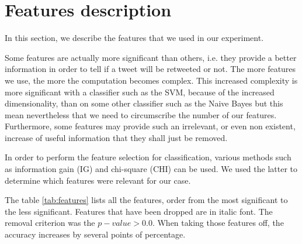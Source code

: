 \section{Features description}
\label{sec:features}

In this section, we describe the features that we used in our experiment.

Some features are actually more significant than others, i.e. they provide a 
better information in order to tell if a tweet will be retweeted or not.
The more features we use, the more the computation becomes 
complex. This increased complexity is more significant with a classifier such 
as the SVM, because of the increased dimensionality, than on some other 
classifier such as the Naive Bayes but this mean nevertheless that we need to 
circumscribe the number of our features. Furthermore, some features may provide 
such an irrelevant, or even non existent, increase of useful information that 
they shall just be removed.

In order to perform the feature selection for classification, various methods 
such as information gain (IG) and chi-square (CHI) can be used. We used the 
latter to determine which features were relevant for our case.

The table \ref{tab:features} lists all the features, order from the most 
significant to the less significant. Features that have been dropped are in 
italic font. The removal criterion was the $p-value>0.0$. When taking those 
features off, the accuracy increases by several points of percentage.

